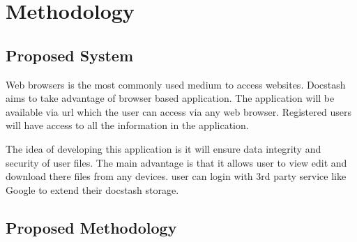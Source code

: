 \chapter{Methodology}
\newpage
\section{Proposed System}

\hspace{0.6cm}Web browsers is the most commonly used medium to access websites. Docstash aims to take advantage of browser based application. The application will be available via url which the user can access via any web browser. Registered users will have access to all the information in the application.

\vspace{0.2cm}The idea of developing this application is it will ensure data integrity and security of user files. The main advantage is that it allows user to view edit and download there files from any devices. user can login with 3rd party service like Google to extend their docstash storage.



\section{Proposed Methodology}


